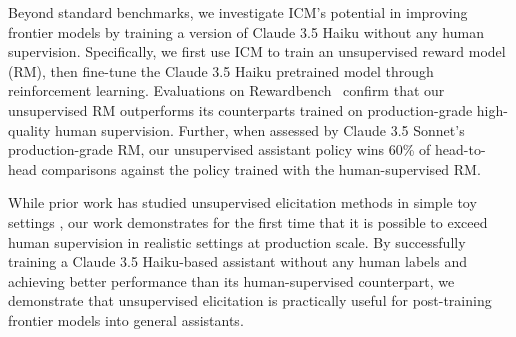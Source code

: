 \documentclass{article}
\newcommand{\ourmethod}[0]{\textsc{ICM}\xspace}
\begin{document}
Beyond standard benchmarks, we investigate \ourmethod's potential in improving frontier models by training a version of Claude 3.5 Haiku without any human supervision. Specifically, we first use \ourmethod to train an unsupervised reward model (RM), then fine-tune the Claude 3.5 Haiku pretrained model through reinforcement learning. Evaluations on Rewardbench~\citep{lambert2024rewardbench} confirm that our unsupervised RM outperforms its counterparts trained on production-grade high-quality human supervision. Further, when assessed by Claude 3.5 Sonnet’s production-grade RM, our unsupervised assistant policy wins 60\% of head-to-head comparisons against the policy trained with the human-supervised RM.

While prior work has studied unsupervised elicitation methods in simple toy settings \citep{burns2022discovering}, our work demonstrates for the first time that it is possible to exceed human supervision in realistic settings at production scale. By successfully training a Claude 3.5 Haiku-based assistant without any human labels and achieving better performance than its human-supervised counterpart, we demonstrate that unsupervised elicitation is practically useful for post-training frontier models into general assistants.



%
\end{document}
